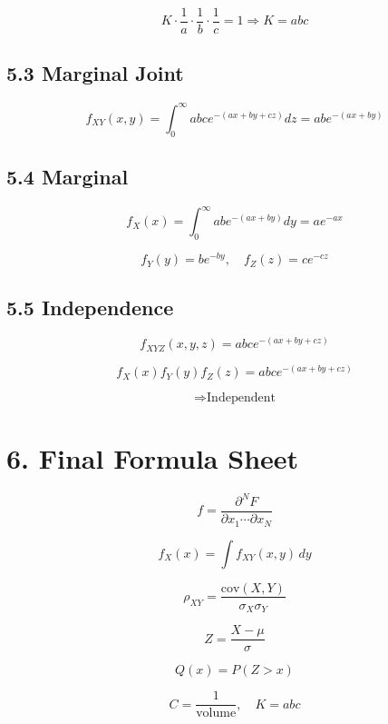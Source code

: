 \documentclass[12pt]{article}
\begin{document}
\[
K \cdot \frac{1}{a}\cdot\frac{1}{b}\cdot\frac{1}{c}=1
\Rightarrow K=abc
\]

\subsection*{5.3 Marginal Joint}
\[
f_{XY}(x,y)
=
\int_0^\infty abc e^{-(ax+by+cz)} dz
=
abe^{-(ax+by)}
\]

\subsection*{5.4 Marginal}
\[
f_X(x)
=
\int_0^\infty abe^{-(ax+by)} dy
=
ae^{-ax}
\]

\[
f_Y(y)=be^{-by}, \quad f_Z(z)=ce^{-cz}
\]

\subsection*{5.5 Independence}
\[
f_{XYZ}(x,y,z)=abc e^{-(ax+by+cz)}
\]

\[
f_X(x)f_Y(y)f_Z(z)
=
abc e^{-(ax+by+cz)}
\]

\[
\Rightarrow \text{Independent}
\]

\section*{6. Final Formula Sheet}

\[
f = \frac{\partial^N F}{\partial x_1 \cdots \partial x_N}
\]

\[
f_X(x)=\int f_{XY}(x,y)\,dy
\]

\[
\rho_{XY}=\frac{\text{cov}(X,Y)}{\sigma_X\sigma_Y}
\]

\[
Z=\frac{X-\mu}{\sigma}
\]

\[
Q(x)=P(Z>x)
\]

\[
C=\frac{1}{\text{volume}}, \quad K=abc
\]
\end{document}
